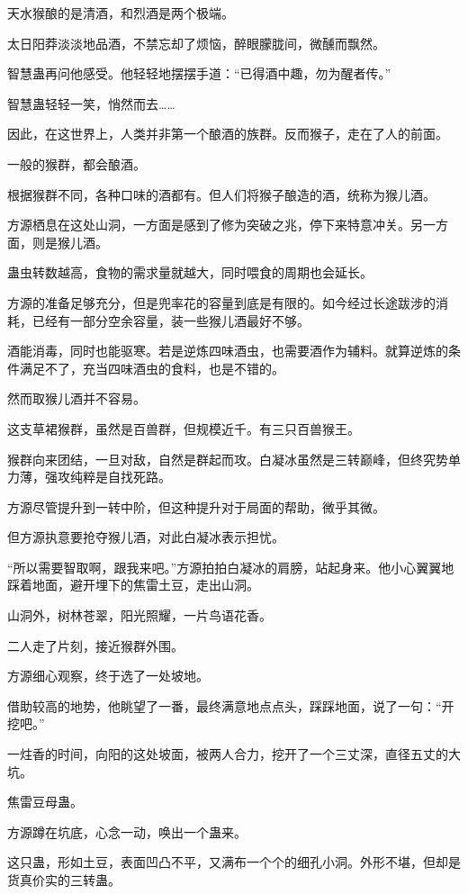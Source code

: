 \begin{this_body}
天水猴酿的是清酒，和烈酒是两个极端。

太日阳莽淡淡地品酒，不禁忘却了烦恼，醉眼朦胧间，微醺而飘然。

智慧蛊再问他感受。他轻轻地摆摆手道：“已得酒中趣，勿为醒者传。”

智慧蛊轻轻一笑，悄然而去……

因此，在这世界上，人类并非第一个酿酒的族群。反而猴子，走在了人的前面。

一般的猴群，都会酿酒。

根据猴群不同，各种口味的酒都有。但人们将猴子酿造的酒，统称为猴儿酒。

方源栖息在这处山洞，一方面是感到了修为突破之兆，停下来特意冲关。另一方面，则是猴儿酒。

蛊虫转数越高，食物的需求量就越大，同时喂食的周期也会延长。

方源的准备足够充分，但是兜率花的容量到底是有限的。如今经过长途跋涉的消耗，已经有一部分空余容量，装一些猴儿酒最好不够。

酒能消毒，同时也能驱寒。若是逆炼四味酒虫，也需要酒作为辅料。就算逆炼的条件满足不了，充当四味酒虫的食料，也是不错的。

然而取猴儿酒并不容易。

这支草裙猴群，虽然是百兽群，但规模近千。有三只百兽猴王。

猴群向来团结，一旦对敌，自然是群起而攻。白凝冰虽然是三转巅峰，但终究势单力薄，强攻纯粹是自找死路。

方源尽管提升到一转中阶，但这种提升对于局面的帮助，微乎其微。

但方源执意要抢夺猴儿酒，对此白凝冰表示担忧。

“所以需要智取啊，跟我来吧。”方源拍拍白凝冰的肩膀，站起身来。他小心翼翼地踩着地面，避开埋下的焦雷土豆，走出山洞。

山洞外，树林苍翠，阳光照耀，一片鸟语花香。

二人走了片刻，接近猴群外围。

方源细心观察，终于选了一处坡地。

借助较高的地势，他眺望了一番，最终满意地点点头，踩踩地面，说了一句：“开挖吧。”

一炷香的时间，向阳的这处坡面，被两人合力，挖开了一个三丈深，直径五丈的大坑。

焦雷豆母蛊。

方源蹲在坑底，心念一动，唤出一个蛊来。

这只蛊，形如土豆，表面凹凸不平，又满布一个个的细孔小洞。外形不堪，但却是货真价实的三转蛊。


\end{this_body}
